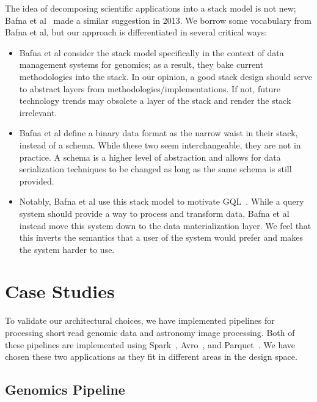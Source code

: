\documentclass{acm_proc_article-sp}
\begin{document}
The idea of decomposing scientific applications into a stack model is not new; Bafna et al~\cite{bafna13}
made a similar suggestion in 2013. We borrow some vocabulary from Bafna et al, but our approach is
differentiated in several critical ways:

\begin{itemize}
\item Bafna et al consider the stack model specifically in the context of data management systems for
genomics; as a result, they bake current methodologies into the stack. In our opinion, a good stack design
should serve to abstract layers from methodologies/implementations. If not, future technology trends may
obsolete a layer of the stack and render the stack irrelevant.
\item Bafna et al define a binary data format as the narrow waist in their stack, instead of a schema. While
these two seem interchangeable, they are not in practice. A schema is a higher level of abstraction and
allows for data serialization techniques to be changed as long as the same schema is still provided.
\item Notably, Bafna et al use this stack model to motivate GQL~\cite{kozanitis14}. While a query system
should provide a way to process and transform data, Bafna et al instead move this system down to the
data materialization layer. We feel that this inverts the semantics that a user of the system would prefer
and makes the system harder to use.
\end{itemize}

\section{Case Studies}
\label{sec:case-studies}

To validate our architectural choices, we have implemented pipelines for processing short read genomic
data and astronomy image processing. Both of these pipelines are implemented using
Spark~\cite{zaharia10}, Avro~\cite{avro}, and Parquet~\cite{parquet}. We have chosen these two
applications as they fit in different areas in the design space. 

\subsection{Genomics Pipeline}
\label{sec:genomics-pipeline}
\end{document}
